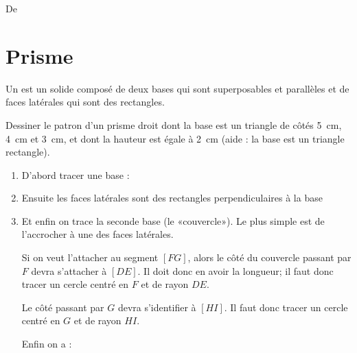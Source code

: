 

De \cite{NRHooXFvgpp5}

\section{Prisme}

\begin{definition}
    Un  est un solide composé de deux bases qui sont superposables et parallèles et de faces latérales qui sont des rectangles.
\end{definition}


\begin{example}
    Dessiner le patron d'un prisme droit dont la base est un triangle de côtés \SI{5}{\centi\meter}, \SI{4}{\centi\meter} et \SI{3}{\centi\meter}, et dont la hauteur est égale à \SI{2}{\centi\meter} (aide : la base est un triangle rectangle).

    \begin{enumerate}
        \item
            D'abord tracer une base :


\begin{center}
   
\end{center}
\item
    Ensuite les faces latérales sont des rectangles perpendiculaires à la base
\begin{center}
   
\end{center}
\item
    Et enfin on trace la seconde base (le «couvercle»). Le plus simple est de l'accrocher à une des faces latérales.

    Si on veut l'attacher au segment \( [FG]\), alors le côté du couvercle passant par \( F\) devra s'attacher à \( [DE]\). Il doit donc en avoir la longueur; il faut donc tracer un cercle centré en \( F\) et de rayon \( DE\).

    Le côté passant par \( G\) devra s'identifier à \( [HI]\). Il faut donc tracer un cercle centré en \( G\) et de rayon \( HI\).

\begin{center}
   
\end{center}

Enfin on a :

\begin{center}

\end{center}
    \end{enumerate}
\end{example}



